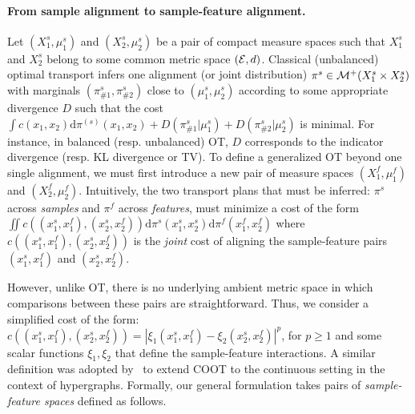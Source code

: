 \paragraph{From sample alignment to sample-feature alignment.}
Let $(X_1^s, \mu_1^s)$ and $(X_2^s, \mu_2^s)$ be a pair of compact measure spaces such that
$X_1^s$ and $X_2^s$ belong to some common metric space $(\mathcal E, d)$.
Classical (unbalanced) optimal transport infers one alignment (or joint distribution)
$\pi^s \in \mathcal M^+(X_1^{s} \times X_2^s)$ with marginals $(\pi^{s}_{\#1}, \pi^{s}_{\#2})$
close to $(\mu_1^s, \mu_2^s)$ according to some appropriate divergence $D$ such that
the cost $\int c(x_1, x_2) \mathrm d\pi^{(s)}(x_1, x_2) + D(\pi^{s}_{\#1} | \mu_1^s)
+ D(\pi^{s}_{\#2} | \mu_2^s)$ is minimal. For instance, in balanced (resp. unbalanced) OT,
$D$ corresponds to the indicator divergence (resp. KL divergence or TV).
To define a generalized OT beyond one single alignment, we must first introduce
a new pair of measure spaces $(X_1^{f}, \mu_1^f)$ and $(X_2^{f}, \mu_2^f)$.
Intuitively,  the two transport plans that must be inferred: $\pi^s$ across \emph{samples}
and $\pi^f$ across \emph{features}, must minimize a cost of the form
$\iint c((x_1^s, x_1^f), (x_2^s, x_2^f))\mathrm d\pi^s(x_1^s, x_2^s)\mathrm d \pi^f(x_1^f, x_2^f)$
where $c((x_1^s, x_1^f), (x_2^s, x_2^f))$ is the \emph{joint} cost of aligning
the sample-feature pairs $(x_1^s, x_1^f)$ and $(x_2^s, x_2^f)$.

However, unlike OT,
there is no underlying ambient metric space in which comparisons between these pairs
are straightforward. Thus, we consider a simplified cost of the form:
$c((x_1^s, x_1^f), (x_2^s, x_2^f)) = |\xi_1(x_1^s, x_1^f) - \xi_2(x_2^s, x_2^f)|^p$, for $p \geq 1$
and some scalar functions $\xi_1, \xi_2$ that define the sample-feature interactions.
A similar definition was adopted by~\citep{Chowdhury21b} to extend COOT to the continuous setting
in the context of hypergraphs. Formally, our general formulation takes
pairs of \emph{sample-feature spaces} defined as follows.

